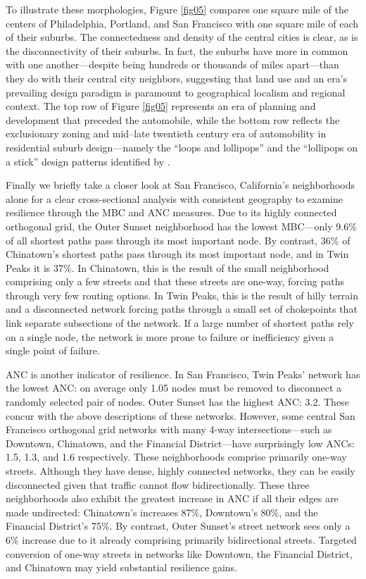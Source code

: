 \documentclass{article}
\begin{document}
To illustrate these morphologies, Figure \ref{fig05} compares one square mile of the centers of Philadelphia, Portland, and San Francisco with one square mile of each of their suburbs. The connectedness and density of the central cities is clear, as is the disconnectivity of their suburbs. In fact, the suburbs have more in common with one another---despite being hundreds or thousands of miles apart---than they do with their central city neighbors, suggesting that land use and an era's prevailing design paradigm is paramount to geographical localism and regional context. The top row of Figure \ref{fig05} represents an era of planning and development that preceded the automobile, while the bottom row reflects the exclusionary zoning and mid--late twentieth century era of automobility in residential suburb design---namely the \enquote{loops and lollipops} and the \enquote{lollipops on a stick} design patterns identified by \citet{southworth_streets_1997}.

Finally we briefly take a closer look at San Francisco, California's neighborhoods alone for a clear cross-sectional analysis with consistent geography to examine resilience through the MBC and ANC measures. Due to its highly connected orthogonal grid, the Outer Sunset neighborhood has the lowest MBC---only 9.6\% of all shortest paths pass through its most important node. By contrast, 36\% of Chinatown's shortest paths pass through its most important node, and in Twin Peaks it is 37\%. In Chinatown, this is the result of the small neighborhood comprising only a few streets and that these streets are one-way, forcing paths through very few routing options. In Twin Peaks, this is the result of hilly terrain and a disconnected network forcing paths through a small set of chokepoints that link separate subsections of the network. If a large number of shortest paths rely on a single node, the network is more prone to failure or inefficiency given a single point of failure.

ANC is another indicator of resilience. In San Francisco, Twin Peaks' network has the lowest ANC: on average only 1.05 nodes must be removed to disconnect a randomly selected pair of nodes. Outer Sunset has the highest ANC: 3.2. These concur with the above descriptions of these networks. However, some central San Francisco orthogonal grid networks with many 4-way intersections---such as Downtown, Chinatown, and the Financial District---have surprisingly low ANCs: 1.5, 1.3, and 1.6 respectively. These neighborhoods comprise primarily one-way streets. Although they have dense, highly connected networks, they can be easily disconnected given that traffic cannot flow bidirectionally. These three neighborhoods also exhibit the greatest increase in ANC if all their edges are made undirected: Chinatown's increases 87\%, Downtown's 80\%, and the Financial District's 75\%. By contrast, Outer Sunset's street network sees only a 6\% increase due to it already comprising primarily bidirectional streets. Targeted conversion of one-way streets in networks like Downtown, the Financial District, and Chinatown may yield substantial resilience gains.
\end{document}
